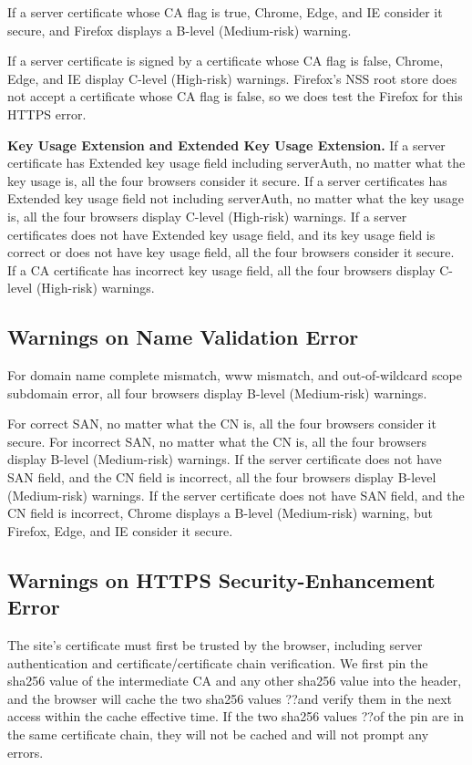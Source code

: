     If a server certificate whose CA flag is true,
    Chrome, Edge, and IE consider it secure,
    and Firefox displays a B-level (Medium-risk) warning.

    If a server certificate is signed by a certificate whose CA flag is false,
     Chrome, Edge, and IE display C-level (High-risk) warnings.
     Firefox's NSS root store does not accept a certificate whose CA flag is false, so we does test the Firefox for this HTTPS error.

\textbf{Key Usage Extension and Extended Key Usage Extension.}
    If a server certificate has Extended key usage field including serverAuth, no matter what the key usage is,
        all the four browsers consider it secure.
    If a server certificates has Extended key usage field not including serverAuth, no matter what the key usage is,
        all the four browsers display C-level (High-risk) warnings.
    If a server certificates does not have Extended key usage field, and its key usage field is correct or does not have key usage field,
        all the four browsers consider it secure.
    If a CA certificate has incorrect key usage field,
        all the four browsers display C-level (High-risk) warnings.

\subsection{Warnings on Name Validation Error}
    For domain name complete mismatch, www mismatch, and out-of-wildcard scope subdomain error,
    all four browsers display B-level (Medium-risk) warnings.

    For correct SAN, no matter what the CN is, all the four browsers consider it secure.
    For incorrect SAN, no matter what the CN is, all the four browsers display B-level (Medium-risk) warnings.
    If the server certificate does not have SAN field, and the CN field is incorrect, all the four browsers display B-level (Medium-risk) warnings.
    If the server certificate does not have SAN field, and the CN field is incorrect,
    Chrome displays a B-level (Medium-risk) warning,
            but Firefox, Edge, and IE consider it secure.

\subsection{Warnings on HTTPS Security-Enhancement Error}

The site's certificate must first be trusted by the browser, including server authentication and certificate/certificate chain verification. We first pin the sha256 value of the intermediate CA and any other sha256 value into the header, and the browser will cache the two sha256 values ??and verify them in the next access within the cache effective time. If the two sha256 values ??of the pin are in the same certificate chain, they will not be cached and will not prompt any errors.

